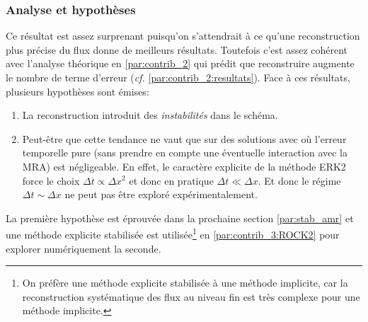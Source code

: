 \subsubsection{Analyse et hypothèses}
Ce résultat est assez surprenant puisqu'on s'attendrait à ce qu'une reconstruction plus précise du flux donne de meilleurs résultats.
Toutefois c'est assez cohérent avec l'analyse théorique en \ref{par:contrib_2} qui prédit que reconstruire augmente le nombre de terme d'erreur (\emph{cf.} \ref{par:contrib_2:resultats}).
Face à ces résultats, plusieurs hypothèses sont émises:
\begin{enumerate}
    \item La reconstruction introduit des \textit{instabilités} dans le schéma.
    \item Peut-être que cette tendance ne vaut que sur des solutions avec où l'erreur temporelle pure (sans prendre en compte une éventuelle interaction avec la MRA) est négligeable.
    En effet, le caractère explicite de la méthode ERK2 force le choix $\Delta t \propto \Delta x^2$ et donc en pratique $\Delta t \ll \Delta x$.
    Et donc le régime $\Delta t \sim \Delta x$ ne peut pas être exploré expérimentalement.
\end{enumerate}
La première hypothèse est éprouvée dans la prochaine section \ref{par:stab_amr} et une méthode explicite stabilisée est utilisée\footnote{
On préfère une méthode explicite stabilisée à une méthode implicite, car la reconstruction systématique des flux au niveau fin est très complexe pour une méthode implicite.} en \ref{par:contrib_3:ROCK2} pour explorer numériquement la seconde.